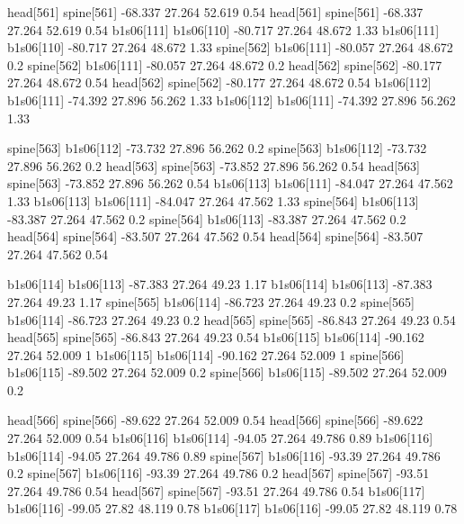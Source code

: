 head[561]    spine[561]    -68.337    27.264    52.619    0.54
head[561]    spine[561]    -68.337    27.264    52.619    0.54
b1s06[111]    b1s06[110]    -80.717    27.264    48.672    1.33
b1s06[111]    b1s06[110]    -80.717    27.264    48.672    1.33
spine[562]    b1s06[111]    -80.057    27.264    48.672    0.2
spine[562]    b1s06[111]    -80.057    27.264    48.672    0.2
head[562]    spine[562]    -80.177    27.264    48.672    0.54
head[562]    spine[562]    -80.177    27.264    48.672    0.54
b1s06[112]    b1s06[111]    -74.392    27.896    56.262    1.33
b1s06[112]    b1s06[111]    -74.392    27.896    56.262    1.33


spine[563]    b1s06[112]    -73.732    27.896    56.262    0.2
spine[563]    b1s06[112]    -73.732    27.896    56.262    0.2
head[563]    spine[563]    -73.852    27.896    56.262    0.54
head[563]    spine[563]    -73.852    27.896    56.262    0.54
b1s06[113]    b1s06[111]    -84.047    27.264    47.562    1.33
b1s06[113]    b1s06[111]    -84.047    27.264    47.562    1.33
spine[564]    b1s06[113]    -83.387    27.264    47.562    0.2
spine[564]    b1s06[113]    -83.387    27.264    47.562    0.2
head[564]    spine[564]    -83.507    27.264    47.562    0.54
head[564]    spine[564]    -83.507    27.264    47.562    0.54


b1s06[114]    b1s06[113]    -87.383    27.264    49.23    1.17
b1s06[114]    b1s06[113]    -87.383    27.264    49.23    1.17
spine[565]    b1s06[114]    -86.723    27.264    49.23    0.2
spine[565]    b1s06[114]    -86.723    27.264    49.23    0.2
head[565]    spine[565]    -86.843    27.264    49.23    0.54
head[565]    spine[565]    -86.843    27.264    49.23    0.54
b1s06[115]    b1s06[114]    -90.162    27.264    52.009    1
b1s06[115]    b1s06[114]    -90.162    27.264    52.009    1
spine[566]    b1s06[115]    -89.502    27.264    52.009    0.2
spine[566]    b1s06[115]    -89.502    27.264    52.009    0.2


head[566]    spine[566]    -89.622    27.264    52.009    0.54
head[566]    spine[566]    -89.622    27.264    52.009    0.54
b1s06[116]    b1s06[114]    -94.05    27.264    49.786    0.89
b1s06[116]    b1s06[114]    -94.05    27.264    49.786    0.89
spine[567]    b1s06[116]    -93.39    27.264    49.786    0.2
spine[567]    b1s06[116]    -93.39    27.264    49.786    0.2
head[567]    spine[567]    -93.51    27.264    49.786    0.54
head[567]    spine[567]    -93.51    27.264    49.786    0.54
b1s06[117]    b1s06[116]    -99.05    27.82    48.119    0.78
b1s06[117]    b1s06[116]    -99.05    27.82    48.119    0.78


